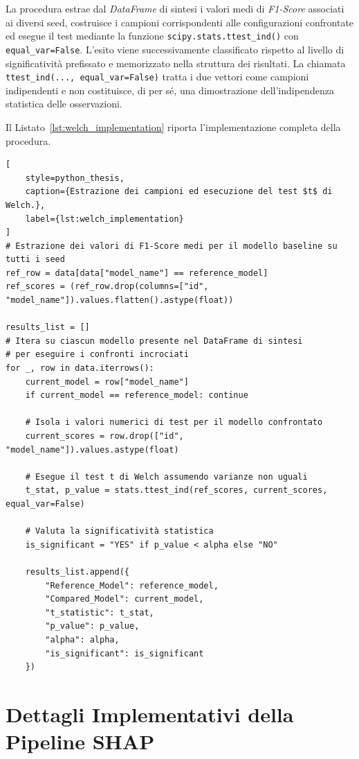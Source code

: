 La procedura estrae dal \textit{DataFrame} di sintesi i valori medi di \textit{F1-Score} associati ai diversi seed, costruisce i campioni corrispondenti alle configurazioni confrontate ed esegue il test mediante la funzione \texttt{scipy.stats.ttest\_ind()} con \texttt{equal\_var=False}. 
L'esito viene successivamente classificato rispetto al livello di significatività prefissato e memorizzato nella struttura dei risultati. La chiamata \texttt{ttest\_ind(..., equal\_var=False)} tratta i due vettori come campioni indipendenti e non costituisce, di per sé, una dimostrazione dell'indipendenza statistica delle osservazioni.

Il Listato~\ref{lst:welch_implementation} riporta l'implementazione completa della procedura.

\begin{lstlisting}[
    style=python_thesis,
    caption={Estrazione dei campioni ed esecuzione del test $t$ di Welch.},
    label={lst:welch_implementation}
]
# Estrazione dei valori di F1-Score medi per il modello baseline su tutti i seed
ref_row = data[data["model_name"] == reference_model]
ref_scores = (ref_row.drop(columns=["id", "model_name"]).values.flatten().astype(float))

results_list = []
# Itera su ciascun modello presente nel DataFrame di sintesi 
# per eseguire i confronti incrociati
for _, row in data.iterrows():
    current_model = row["model_name"]
    if current_model == reference_model: continue

    # Isola i valori numerici di test per il modello confrontato
    current_scores = row.drop(["id", "model_name"]).values.astype(float)

    # Esegue il test t di Welch assumendo varianze non uguali
    t_stat, p_value = stats.ttest_ind(ref_scores, current_scores, equal_var=False)

    # Valuta la significatività statistica
    is_significant = "YES" if p_value < alpha else "NO"

    results_list.append({
        "Reference_Model": reference_model,
        "Compared_Model": current_model,
        "t_statistic": t_stat,
        "p_value": p_value,
        "alpha": alpha,
        "is_significant": is_significant
    })
\end{lstlisting}



\section{Dettagli Implementativi della Pipeline SHAP}
\label{app:shap_implementation}

